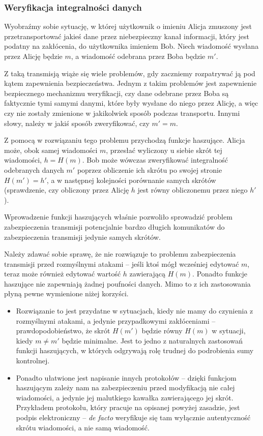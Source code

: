\documentclass[12pt,a4paper,twoside]{article}
\begin{document}
\subsubsection{Weryfikacja integralności danych}
\label{sec:usage_integrity_check}

Wyobraźmy sobie sytuację, w której użytkownik o imieniu Alicja zmuszony jest
przetransportować jakieś dane przez niebezpieczny kanał informacji, który jest
podatny na zakłócenia, do użytkownika imieniem Bob. Niech wiadomość wysłana
przez Alicję będzie $m$, a wiadomość odebrana przez Boba będzie $m'$.


Z taką transmisją wiąże się wiele problemów, gdy zaczniemy rozpatrywać ją pod
kątem zapewnienia bezpieczeństwa. Jednym z takim problemów jest zapewnienie
bezpiecznego mechanizmu weryfikacji, czy dane odebrane przez Boba są faktycznie
tymi samymi danymi, które były wysłane do niego przez Alicję, a więc czy nie
zostały zmienione w jakikolwiek sposób podczas transportu. Innymi słowy, należy
w jakiś sposób zweryfikować, czy $m' = m$.

Z pomocą w rozwiązaniu tego problemu przychodzą funkcje haszujące. Alicja może,
obok samej wiadomości $m$, przesłać wyliczony u siebie skrót tej wiadomości,
$h=H(m)$. Bob może wówczas zweryfikować integralność odebranych danych $m'$
poprzez obliczenie ich skrótu po swojej stronie $H(m')=h'$, a w następnej
kolejności porównanie samych skrótów (sprawdzenie, czy obliczony przez Alicję
$h$ jest równy obliczonemu przez niego $h'$).

Wprowadzenie funkcji haszujących właśnie pozwoliło sprowadzić problem
zabezpieczenia transmisji potencjalnie bardzo długich komunikatów do
zabezpieczenia transmisji jedynie samych skrótów.

Należy zdawać sobie sprawę, że nie rozwiązuje to problemu zabezpieczenia
transmisji przed rozmyślnymi atakami -- jeśli ktoś mógł wcześniej edytować $m$,
teraz może również edytować wartość $h$ zawierającą $H(m)$. Ponadto funkcje
haszujące nie zapewniają żadnej poufności danych. Mimo to z ich zastosowania
płyną pewne wymienione niżej korzyści.

\begin{itemize}
\item Rozwiązanie to jest przydatne w sytuacjach, kiedy nie mamy do czynienia z
rozmyślnymi atakami, a jedynie przypadkowymi zakłóceniami --
prawdopodobieństwo, że skrót $H(m')$ będzie równy $H(m)$ w sytuacji, kiedy $m
\neq m'$ będzie minimalne. Jest to jedno z naturalnych zastosowań funkcji
haszujących, w których odgrywają rolę trudnej do podrobienia sumy kontrolnej.
\item Ponadto ułatwione jest napisanie innych protokołów -- dzięki funkcjom
haszującym zależy nam na zabezpieczeniu przed modyfikacją nie całej wiadomości,
a jedynie jej malutkiego kawałka zawierającego jej skrót. Przykładem protokołu,
który pracuje na opisanej powyżej zasadzie, jest podpis elektroniczny --
\emph{de facto} weryfikuje się tam wyłącznie autentyczność skrótu wiadomości, a
nie samą wiadomość.
\end{itemize}
\end{document}

